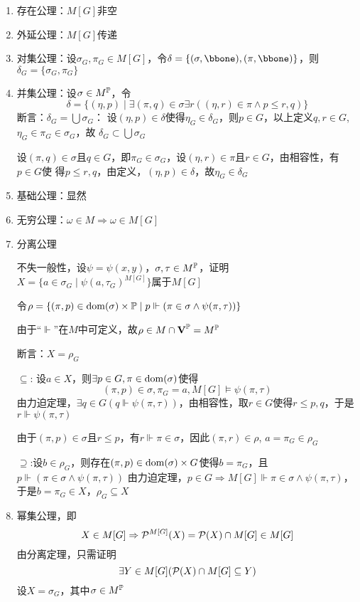 \documentclass[11pt]{article}
\begin{document}
\begin{enumerate}
\item 存在公理：\(M[G]\)非空
\item 外延公理：\(M[G]\)传递
\item 对集公理：设\(\sigma_G,\pi_G\in M[G]\)，令\(\delta=\{(\sigma,\bbone),(\pi,\bbone)\}\)，则\(\delta_G=\{\sigma_G,\pi_G\}\)
\item 并集公理：设\(\sigma\in M^{\P}\)，令
\begin{equation*}
\delta=\{(\eta,p)\mid\exists(\pi,q)\in\sigma\exists r((\eta,r)\in\pi\wedge p\le r,q)\}
\end{equation*}
断言：\(\delta_G=\bigcup\sigma_G\)：
设\((\eta,p)\in\delta\)使得\(\eta_G\in\delta_G\)，则\(p\in G\)，以上定义\(q,r\in G\), \(\eta_G\in\pi_G\in\sigma_G\)，故
\(\delta_G\subset\bigcup\sigma_G\)

设\((\pi,q)\in\sigma\)且\(q\in G\)，即\(\pi_G\in\sigma_G\)，设\((\eta,r)\in\pi\)且\(r\in G\)，由相容性，有\(p\in G\)使
得\(p\le r,q\)，由定义，\((\eta,p)\in\delta\)，故\(\eta_G\in\delta_G\)
\item 基础公理：显然
\item 无穷公理：\(\omega\in M\Rightarrow\omega\in M[G]\)
\item 分离公理

不失一般性，设\(\psi=\psi(x,y)\)，\(\sigma,\tau\in M^{\P}\)，证明
\(X=\{a\in\sigma_G\mid\psi(a,\tau_G)^{M[G]}\}\)属于\(M[G]\)

令\(\rho=\{(\pi,p)\in\dom(\sigma)\times\P\mid p\Vdash(\pi\in\sigma\wedge\psi(\pi,\tau))\}\)

由于``\(\Vdash\)''在\(M\)中可定义，故\(\rho\in M\cap\bV^{\P}=M^{\P}\)

断言：\(X=\rho_G\)

\(\subseteq\): 设\(a\in X\)，则\(\exists p\in G,\pi\in\dom(\sigma)\)使得
\begin{equation*}
(\pi,p)\in\sigma,\pi_G=a,M[G]\vDash\psi(\pi,\tau)
\end{equation*}
由力迫定理，\(\exists q\in G(q\Vdash\psi(\pi,\tau))\)，由相容性，取\(r\in G\)使得\(r\le p,q\)，于是
\(r\Vdash\psi(\pi,\tau)\)

由于\((\pi,p)\in\sigma\)且\(r\le p\)，有\(r\Vdash\pi\in\sigma\)，因此\((\pi,r)\in\rho\), \(a=\pi_G\in\rho_G\)

\(\supseteq\):设\(b\in\rho_G\)，则存在\((\pi,p)\in\dom(\sigma)\times G\)使得\(b=\pi_G\)，且\(p\Vdash(\pi\in\sigma\wedge\psi(\pi,\tau))\)
由力迫定理，\(p\in G\Rightarrow M[G]\Vdash\pi\in\sigma\wedge\psi(\pi,\tau)\)，于是\(b=\pi_G\in X\)，\(\rho_G\subseteq X\)
\item 幂集公理，即
\begin{equation*}
X\in M[G]\Rightarrow\calp^{M[G]}(X)=\calp(X)\cap M[G]\in M[G]
\end{equation*}
由分离定理，只需证明
\begin{equation*}
\exists Y\in M[G](\calp(X)\cap M[G]\subseteq Y)
\end{equation*}
设\(X=\sigma_G\)，其中\(\sigma\in M^{\P}\)


\end{enumerate}
\end{document}
